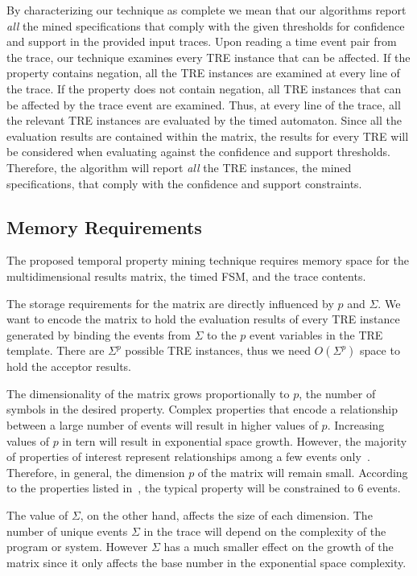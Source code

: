 \documentclass[]{sigplanconf}
\begin{document}
By characterizing our technique as complete we mean that our algorithms report \emph{all} the mined specifications that comply with the given thresholds for confidence and support in the provided input traces. Upon reading a time event pair from the trace, our technique examines every TRE instance that can be affected. If the property contains negation, all the TRE instances are examined at every line of the trace. If the property does not contain negation, all TRE instances that can be affected by the trace event are examined. Thus, at every line of the trace, all the relevant TRE instances are evaluated by the timed automaton. Since all the evaluation results are contained within the matrix, the results for every TRE will be considered when evaluating against the confidence and support thresholds. Therefore, the algorithm will report \emph{all} the TRE instances, the mined specifications, that comply with the confidence and support constraints.


\subsection{Memory Requirements}

The proposed temporal property mining technique requires memory space for the multidimensional results matrix, the timed FSM, and the trace contents.

The storage requirements for the matrix are directly influenced by $p$ and $\Sigma$.
We want to encode the matrix to hold the evaluation results of every TRE instance generated by binding the events from $\Sigma$ to the $p$ event variables in the TRE template. There are $\Sigma^p$ possible TRE instances, thus we need $O(\Sigma^p)$ space to hold the acceptor results.

The dimensionality of the matrix grows proportionally to $p$, the number of symbols in the desired property.
Complex properties that encode a relationship between a large number of events will result in higher values of $p$.
Increasing values of $p$ in tern will result in exponential space growth.
However, the majority of properties of interest represent relationships among a few events only~\cite{evans1,dwyer1999patterns}.
Therefore, in general, the dimension $p$ of the matrix will remain small.
According to the properties listed in~\cite{dwyer1999patterns}, the typical property will be constrained to 6 events.

The value of $\Sigma$, on the other hand, affects the size of each dimension.
The number of unique events $\Sigma$ in the trace will depend on the complexity of the program or system.
However $\Sigma$ has a much smaller effect on the growth of the matrix since it only affects the base number in the
exponential space complexity.
\end{document}
